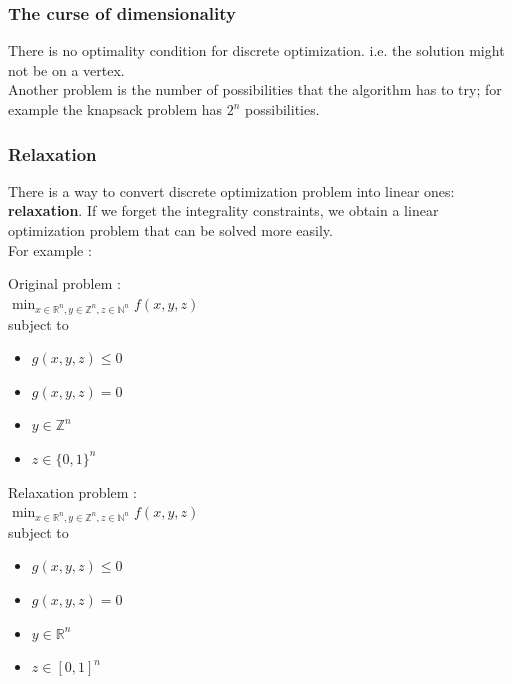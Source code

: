 \documentclass[../main.tex]{subfiles}
\begin{document}
\subsubsection{The curse of dimensionality}
\warning There is no optimality condition for discrete optimization. i.e. the solution might not be on a vertex.\\

Another problem is the number of possibilities that the algorithm has to try; for example the knapsack problem has $2^n$ possibilities.\\

\subsubsection{Relaxation}
There is a way to convert discrete optimization problem into linear ones: \textbf{relaxation}. If we forget the integrality constraints, we obtain a linear optimization problem that can be solved more easily.\\
For example : \\
\begin{minipage}{.49\textwidth}
    Original problem : \\
    $\min_{x \in \mathbb{R}^n, y \in \mathbb{Z}^n, z \in \mathbb{N}^n} f(x,y,z)$\\
    subject to \begin{itemize}
        \item $g(x,y,z) \leq 0$\\
        \item $g(x,y,z) = 0$\\
        \item $y\in \mathbb{Z}^n$\\
        \item $z\in \{0,1\}^n$\\
    \end{itemize}
\end{minipage}
\hfill
\begin{minipage}{.49\textwidth}
    Relaxation problem : \\
    $\min_{x \in \mathbb{R}^n, y \in \mathbb{Z}^n, z \in \mathbb{N}^n} f(x,y,z)$\\
    subject to \begin{itemize}
        \item $g(x,y,z) \leq 0$\\
        \item $g(x,y,z) = 0$\\
        \item $y\in \mathbb{R}^n$\\
        \item $z\in [0,1]^n$\\
    \end{itemize}
\end{minipage}
\end{document}
